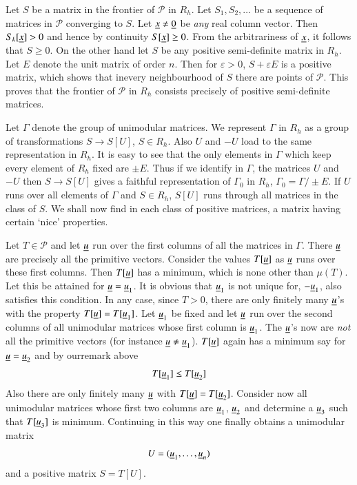 Let $S$ be a matrix in the frontier of $\mathscr{P}$ in $R_{h}$. Let
$S_{1}, S_{2},\ldots$ be a sequence of matrices in $\mathscr{P}$
converging to $S$. Let $\underline{x}\neq \underline{0}$ be {\em any} real column
vector. Then $S_{k}[\underline{x}]>0$ and hence by continuity $S[\underline{x}]\geq
0$. From the arbitrariness of $\underline{x}$, it follows that $S\geq 0$. On
the other hand let $S$ be any positive semi-definite matrix in
$R_{h}$. Let $E$ denote the unit matrix of order $n$. Then for
$\varepsilon>0$, $S+\varepsilon E$ is a positive matrix, which shows that
in\pageoriginale every neighbourhood of $S$ there are points of
$\mathscr{P}$. This proves that the frontier of $\mathscr{P}$ in
$R_{h}$ consists precisely of positive semi-definite matrices.

Let $\Gamma$ denote the group of unimodular matrices. We represent
$\Gamma$ in $R_{h}$ as a group of transformations $S\to S[U]$, $S\in
R_{h}$. Also $U$ and $-U$ load to the same representation in
$R_{h}$. It is easy to see that the only elements in $\Gamma$ which
keep every element of $R_{h}$ fixed are $\pm E$. Thus if we identify
in $\Gamma$, the matrices $U$ and $-U$ then $S\to S[U]$ gives a
faithful representation of $\Gamma_{0}$ in $R_{h}$,
$\Gamma_{0}=\Gamma/\pm E$. If $U$ runs over all elements of $\Gamma$
and $S\in R_{h}$, $S[U]$ runs through all matrices in the class of
$S$. We shall now find in each class of positive matrices, a matrix
having certain `nice' properties.

Let $T\in\mathscr{P}$ and let $\underline{u}$ run over the first columns of
all the matrices in $\Gamma$. There $\underline{u}$ are precisely all the
primitive vectors. Consider the values $T[\underline{u}]$ as $\underline{u}$ runs
over these first columns. Then $T[\underline{u}]$ has a minimum, which is
none other than $\mu(T)$. Let this be attained for
$\underline{u}=\underline{u}_{1}$. It is obvious that $\underline{u}_{1}$ is not unique
for, $-\underline{u}_{1}$, also satisfies this condition. In any case, since
$T>0$, there are only finitely many $\underline{u}$'s with the property
$T[\underline{u}]=T[\underline{u}_{1}]$. Let $\underline{u}_{1}$ be fixed and let $\underline{u}$
run over the second columns of all unimodular matrices whose first
column is $\underline{u}_{1}$. The $\underline{u}$'s now are {\em not} all the
primitive vectors (for instance $\underline{u}\neq \underline{u}_{1}$). $T[\underline{u}]$
again has a minimum say for $\underline{u}=\underline{u}_{2}$ and by
our\pageoriginale remark above
$$
T[\underline{u}_{1}]\leq T[\underline{u}_{2}]
$$
Also there are only finitely many $\underline{u}$ with
$T[\underline{u}]=T[\underline{u}_{2}]$. Consider now all unimodular matrices whose
first two columns are $\underline{u}_{1}$, $\underline{u}_{2}$ and determine a
$\underline{u}_{3}$ such that $T[\underline{u}_{3}]$ is minimum. Continuing in this
way one finally obtains a unimodular matrix
$$
U=(\underline{u}_{1},\ldots,\underline{u}_{n})
$$
and a positive matrix $S=T[U]$.

